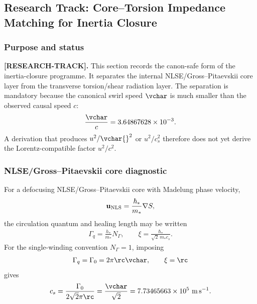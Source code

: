 

\subsection{Research Track: Core--Torsion Impedance Matching for Inertia Closure}
\label{sec:rt_core_torsion_impedance_matching}

\subsubsection{Purpose and status}

\textbf{[RESEARCH-TRACK].}
This section records the canon-safe form of the inertia-closure programme. It separates the internal NLSE/Gross--Pitaevskii core layer from the transverse torsion/shear radiation layer. The separation is mandatory because the canonical swirl speed \(\vchar\) is much smaller than the observed causal speed \(c\):
\begin{align}
    \frac{\vchar}{c}=3.64867628\times10^{-3}.
\end{align}
A derivation that produces \(u^2/\vchar{}^2\) or \(u^2/c_s^2\) therefore does not yet derive the Lorentz-compatible factor \(u^2/c^2\).

\subsubsection{NLSE/Gross--Pitaevskii core diagnostic}

For a defocusing NLSE/Gross--Pitaevskii core with Madelung phase velocity,
\begin{align}
    \mathbf u_{\rm NLS}=\frac{\hbar_*}{m_*}\nabla S,
\end{align}
the circulation quantum and healing length may be written
\begin{align}
    \Gamma_q = \frac{h_*}{m_*}N_\Gamma,
    \qquad
    \xi = \frac{\hbar_*}{\sqrt{2}\,m_*c_s}.
\end{align}
For the single-winding convention \(N_\Gamma=1\), imposing
\begin{align}
    \Gamma_q=\Gamma_0=2\pi\rc\vchar,
    \qquad
    \xi=\rc
\end{align}
gives
\begin{align}
    c_s
    =
    \frac{\Gamma_0}{2\sqrt{2}\pi\rc}
    =
    \frac{\vchar}{\sqrt{2}}
    =
    7.73465663\times10^{5}\ \mathrm{m\,s^{-1}}.
    \label{eq:rt_core_torsion_cs}
\end{align}

